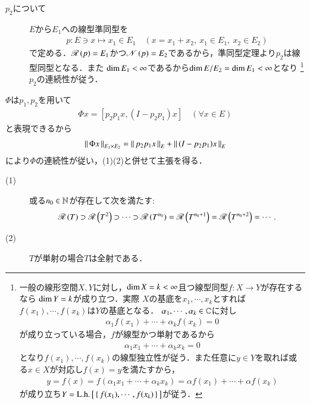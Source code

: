 \begin{prf}
\begin{description}
\begin{description}
					\item[$p_2$について] $E$から$E_1$への線型準同型を
						\begin{align}
							p:E \ni x \longmapsto x_1 \in E_1 \quad (x = x_1 + x_2,\ x_1 \in E_1,\ x_2 \in E_2)
						\end{align}
						で定める．$\mathscr{R}\left( p \right) = E_1$かつ$\mathscr{N}\left( p \right) = E_2$であるから，準同型定理より$p_2$は線型同型となる．また
						$\operatorname{dim} E_1 < \infty$であるから$\operatorname{dim} E/E_2 = \operatorname{dim} E_1 < \infty$となり
						\footnote{
							一般の線形空間$X,Y$に対し，$\operatorname{dim} X = k < \infty$且つ線型同型$f:X \rightarrow Y$が存在するなら
							$\operatorname{dim} Y = k$が成り立つ．実際
							$X$の基底を$x_1,\cdots,x_k$とすれば
							$f(x_1),\cdots,f(x_k)$は$Y$の基底となる．
							$\alpha_1,\cdots,\alpha_k \in \mathbb{C}$に対し
							\begin{align}
								\alpha_1 f(x_1) + \cdots + \alpha_k f(x_k) = 0
							\end{align}
							が成り立っている場合，$f$が線型かつ単射であるから
							\begin{align}
								\alpha_1 x_1 + \cdots + \alpha_k x_k = 0
							\end{align}
							となり$f(x_1),\cdots,f(x_k)$の線型独立性が従う．また任意に$y \in Y$を取れば或る$x \in X$が対応し$f(x) = y$を満たすから，
							\begin{align}
								y = f(x) = f(\alpha_1 x_1 + \cdots + \alpha_k x_k) = \alpha f(x_1) + \cdots + \alpha f(x_k)
							\end{align}
							が成り立ち$Y = \mathrm{L.h.}\left[\, \left\{\, f(x_1),\cdots,f(x_k)\, \right\}\, \right]$が従う．
						}
						$p_2$の連続性が従う．
				\end{description}
				$\Phi$は$p_1,p_2$を用いて
				\begin{align}
					\Phi x = [p_2 p_1 x, (I - p_2 p_1) x] \quad (\forall x \in E)
				\end{align}
				と表現できるから
				\begin{align}
					\left\|\, \Phi x\, \right\|_{E_1 \times E_2} = \left\|\, p_2 p_1 x\, \right\|_{E} + \left\|\, (I - p_2 p_1) x\, \right\|_{E} 
				\end{align}
				により$\Phi$の連続性が従い，(1)(2)と併せて主張を得る．
				\QED
		\end{description}
	\end{prf}
	
	\begin{screen}
		\begin{lem}[$T$が単射なら全射]\mbox{}
			\begin{description}
				\item[(1)]	或る$n_0 \in \mathbb{N}$が存在して次を満たす:
					\begin{align}
						\mathscr{R}\left( T \right) \supset \mathscr{R}\left( T^2 \right) \supset \cdots \supset \mathscr{R}\left( T^{n_0} \right) = \mathscr{R}\left( T^{n_0 + 1} \right) = \mathscr{R}\left( T^{n_0 + 2} \right) = \cdots.
 					\end{align}

				\item[(2)] $T$が単射の場合$T$は全射である．
			\end{description}
		\end{lem}
	\end{screen}